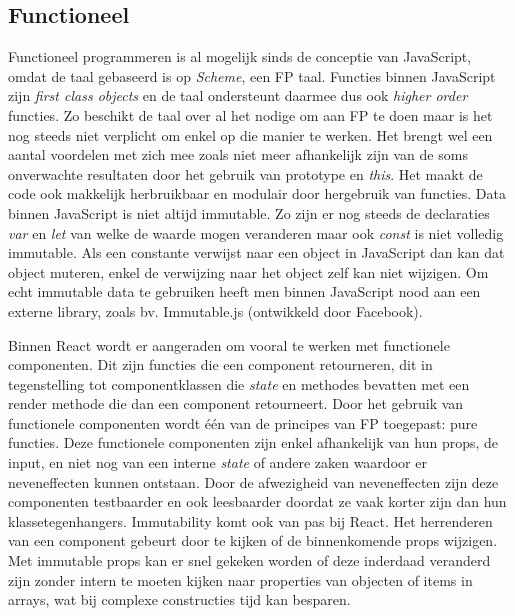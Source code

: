 \subsection{Functioneel}
Functioneel programmeren is al mogelijk sinds de conceptie van JavaScript, omdat de taal gebaseerd is op \textit{Scheme}, een FP taal. Functies binnen JavaScript zijn \textit{first class objects} en de taal ondersteunt daarmee dus ook \textit{higher order} functies. Zo beschikt de taal over al het nodige om aan FP te doen maar is het nog steeds niet verplicht om enkel op die manier te werken. Het brengt wel een aantal voordelen met zich mee zoals niet meer afhankelijk zijn van de soms onverwachte resultaten door het gebruik van prototype en \textit{this}. Het maakt de code ook makkelijk herbruikbaar en modulair door hergebruik van functies. Data binnen JavaScript is niet altijd immutable. Zo zijn er nog steeds de declaraties \textit{var} en \textit{let} van welke de waarde mogen veranderen maar ook \textit{const} is niet volledig immutable. Als een constante verwijst naar een object in JavaScript dan kan dat object muteren, enkel de verwijzing naar het object zelf kan niet wijzigen. Om echt immutable data te gebruiken heeft men binnen JavaScript nood aan een externe library, zoals bv. Immutable.js (ontwikkeld door Facebook).

Binnen React wordt er aangeraden om vooral te werken met functionele componenten. Dit zijn functies die een component retourneren, dit in tegenstelling tot componentklassen die \textit{state} en methodes bevatten met een render methode die dan een component retourneert. Door het gebruik van functionele componenten wordt één van de principes van FP toegepast: pure functies. Deze functionele componenten zijn enkel afhankelijk van hun props, de input, en niet nog van een interne \textit{state} of andere zaken waardoor er neveneffecten kunnen ontstaan. Door de afwezigheid van neveneffecten zijn deze componenten testbaarder en ook leesbaarder doordat ze vaak korter zijn dan hun klassetegenhangers. Immutability komt ook van pas bij React. Het herrenderen van een component gebeurt door te kijken of de binnenkomende props wijzigen. Met immutable props kan er snel gekeken worden of deze inderdaad veranderd zijn zonder intern te moeten kijken naar properties van objecten of items in arrays, wat bij complexe constructies tijd kan besparen. 